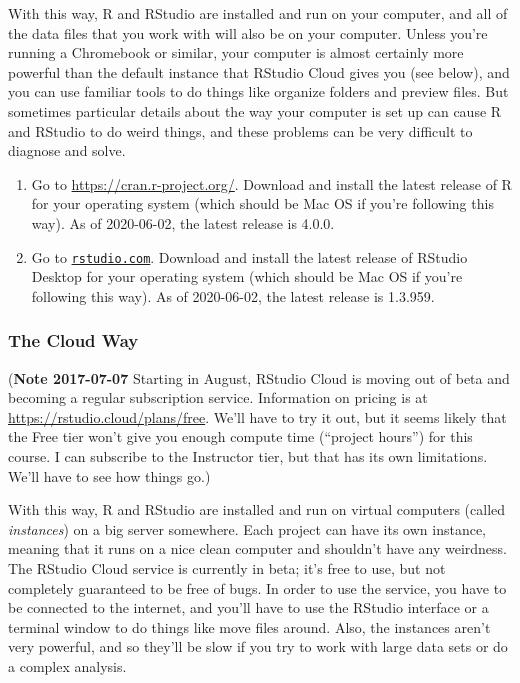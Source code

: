 \documentclass[
]{article}
\begin{document}
With this way, R and RStudio are installed and run on your computer, and all of the data files that you work with will also be on your computer. Unless you're running a Chromebook or similar, your computer is almost certainly more powerful than the default instance that RStudio Cloud gives you (see below), and you can use familiar tools to do things like organize folders and preview files. But sometimes particular details about the way your computer is set up can cause R and RStudio to do weird things, and these problems can be very difficult to diagnose and solve.

\begin{enumerate}
\def\labelenumi{\arabic{enumi}.}
\item
  Go to \url{https://cran.r-project.org/}. Download and install the latest release of R for your operating system (which should be Mac OS if you're following this way). As of 2020-06-02, the latest release is 4.0.0.
\item
  Go to \href{https://rstudio.com/products/rstudio/download/\#download}{\texttt{rstudio.com}}. Download and install the latest release of RStudio Desktop for your operating system (which should be Mac OS if you're following this way). As of 2020-06-02, the latest release is 1.3.959.
\end{enumerate}

\hypertarget{the-cloud-way}{%
\subsubsection{The Cloud Way}\label{the-cloud-way}}

(\textbf{Note 2017-07-07} Starting in August, RStudio Cloud is moving out of beta and becoming a regular subscription service. Information on pricing is at \url{https://rstudio.cloud/plans/free}. We'll have to try it out, but it seems likely that the Free tier won't give you enough compute time (``project hours'') for this course. I can subscribe to the Instructor tier, but that has its own limitations. We'll have to see how things go.)

With this way, R and RStudio are installed and run on virtual computers (called \emph{instances}) on a big server somewhere. Each project can have its own instance, meaning that it runs on a nice clean computer and shouldn't have any weirdness. The RStudio Cloud service is currently in beta; it's free to use, but not completely guaranteed to be free of bugs. In order to use the service, you have to be connected to the internet, and you'll have to use the RStudio interface or a terminal window to do things like move files around. Also, the instances aren't very powerful, and so they'll be slow if you try to work with large data sets or do a complex analysis.
\end{document}
